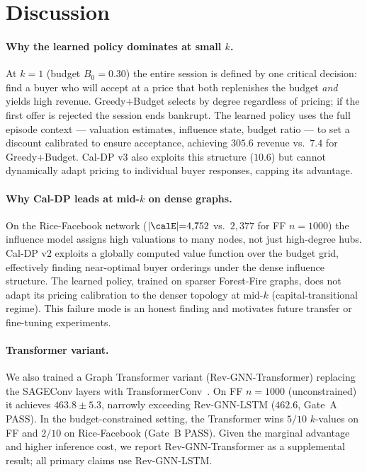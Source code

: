 
\section{Discussion}
\label{sec:discussion}

\paragraph{Why the learned policy dominates at small $k$.}
At $k{=}1$ (budget $B_0{=}0.30$) the entire session is defined by one critical
decision: find a buyer who will accept at a price that both replenishes the budget
\emph{and} yields high revenue.
Greedy+Budget selects by degree regardless of pricing; if the first offer is
rejected the session ends bankrupt.
The learned policy uses the full episode context — valuation estimates, influence
state, budget ratio — to set a discount calibrated to ensure acceptance, achieving
$305.6$ revenue vs.\ $7.4$ for Greedy+Budget. %
Cal-DP v3 also exploits this structure ($10.6$) but cannot dynamically adapt
pricing to individual buyer responses, capping its advantage.

\paragraph{Why Cal-DP leads at mid-$k$ on dense graphs.}
On the Rice-Facebook network ($|\calE|{=}4{,}752$ vs.\ $2{,}377$ for FF $n{=}1000$)
the influence model assigns high valuations to many nodes, not just high-degree
hubs.
Cal-DP v2 exploits a globally computed value function over the budget grid,
effectively finding near-optimal buyer orderings under the dense influence
structure.
The learned policy, trained on sparser Forest-Fire graphs, does not adapt its
pricing calibration to the denser topology at mid-$k$ (capital-transitional
regime).
This failure mode is an honest finding and motivates future transfer or
fine-tuning experiments.

\paragraph{Transformer variant.}
We also trained a Graph Transformer variant (Rev-GNN-Transformer) replacing the
SAGEConv layers with TransformerConv~\citep{shi2021masked}.
On FF $n{=}1000$ (unconstrained) it achieves $463.8 \pm 5.3$, %
narrowly exceeding Rev-GNN-LSTM ($462.6$, Gate~A PASS). %
In the budget-constrained setting, the Transformer wins $5/10$ $k$-values on FF
and $2/10$ on Rice-Facebook (Gate~B PASS). %
Given the marginal advantage and higher inference cost, we report
Rev-GNN-Transformer as a supplemental result; all primary claims use Rev-GNN-LSTM.

